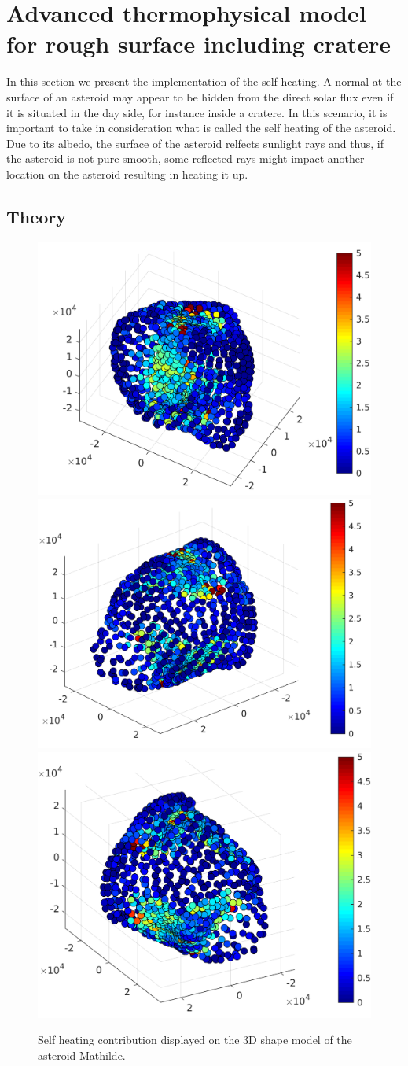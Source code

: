 \section{Advanced thermophysical model for rough surface including cratere}
\label{sec:5}

In this section we present the implementation of the self heating. A normal at the surface of an asteroid may appear to be hidden from the direct solar flux even if it is situated in the day side, for instance inside a cratere. In this scenario, it is important to take in consideration what is called the self heating of the asteroid. Due to its albedo, the surface of the asteroid relfects sunlight rays and thus, if the asteroid is not pure smooth, some reflected rays might impact another location on the asteroid resulting in heating it up.

\subsection{Theory}

\begin{figure}[b]
    \centering
    \includegraphics[width=0.33\linewidth]{rsc/self_3D_1.png}
    \includegraphics[width=0.33\linewidth]{rsc/self_3D_2.png}
    \includegraphics[width=0.33\linewidth]{rsc/self_3D_3.png}
    \caption{Self heating contribution displayed on the 3D shape model of the asteroid Mathilde.}
    \label{fig:5.5}
\end{figure}

